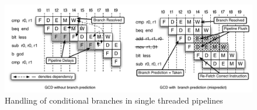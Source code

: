 \begin{figure}
\begin{center}
\includegraphics[scale=.58]{figs/branch_execution_non_interleaved_pipeline}
\end{center}
\vspace{-10pt}
\caption{Handling of conditional branches in single threaded pipelines}
\label{fig:branch_execution_non_interleaved_pipeline}
\end{figure}

